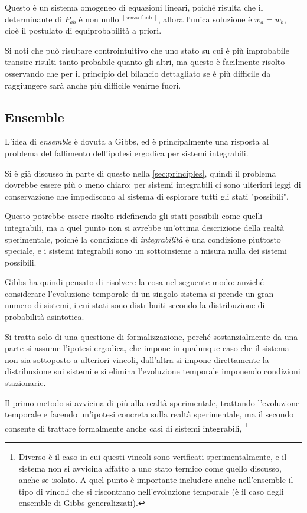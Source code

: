 Questo è un sistema omogeneo di equazioni lineari, poiché risulta che il determinante di $P_{ab}$ è non nullo $^{[\text{senza fonte}]}$, allora l'unica soluzione è $w_a = w_b$, cioè il postulato di equiprobabilità a priori.
\newline

Si noti che può risultare controintuitivo che uno stato su cui è più improbabile transire risulti tanto probabile quanto gli altri, ma questo è facilmente risolto osservando che per il principio del bilancio dettagliato se è più difficile da raggiungere sarà anche più difficile venirne fuori.

\subsection{Ensemble}
L'idea di \textit{ensemble} è dovuta a Gibbs, ed è principalmente una risposta al problema del fallimento dell'ipotesi ergodica per sistemi integrabili.
\newline

Si è già discusso in parte di questo nella \cref{sec:principles}, quindi il problema dovrebbe essere più o meno chiaro: per sistemi integrabili ci sono ulteriori leggi di conservazione che impediscono al sistema di esplorare tutti gli stati "possibili".

Questo potrebbe essere risolto ridefinendo gli stati possibili come quelli integrabili, ma a quel punto non si avrebbe un'ottima descrizione della realtà sperimentale, poiché la condizione di \textit{integrabilità} è una condizione piuttosto speciale, e i sistemi integrabili sono un sottoinsieme a misura nulla dei sistemi possibili.

Gibbs ha quindi pensato di risolvere la cosa nel seguente modo: anziché considerare l'evoluzione temporale di un singolo sistema si prende un gran numero di sistemi, i cui stati sono distribuiti secondo la distribuzione di probabilità asintotica.

Si tratta solo di una questione di formalizzazione, perché sostanzialmente da una parte si assume l'ipotesi ergodica, che impone in qualunque caso che il sistema non sia sottoposto a ulteriori vincoli, dall'altra si impone direttamente la distribuzione sui sistemi e si elimina l'evoluzione temporale imponendo condizioni stazionarie.

Il primo metodo si avvicina di più alla realtà sperimentale, trattando l'evoluzione temporale e facendo un'ipotesi concreta sulla realtà sperimentale, ma il secondo consente di trattare formalmente anche casi di sistemi integrabili,
\footnote{Diverso è il caso in cui questi vincoli sono verificati sperimentalmente, e il sistema non si avvicina affatto a uno stato termico come quello discusso, anche se isolato. A quel punto è importante includere anche nell'ensemble il tipo di vincoli che si riscontrano nell'evoluzione temporale (è il caso degli \href{https://journals.aps.org/pr/abstract/10.1103/PhysRev.106.620}{ensemble di Gibbs generalizzati}).}
\newline

